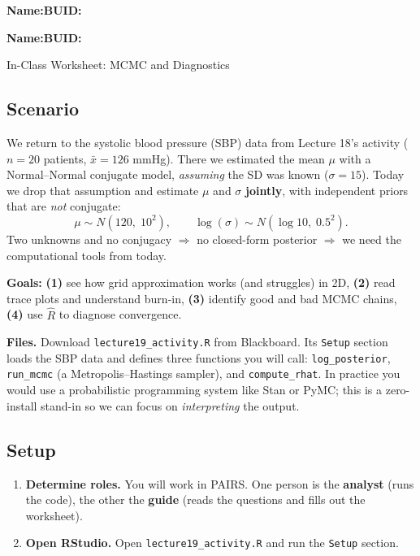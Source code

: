 \documentclass{article}
\newcommand{\blankline}[1]{\underline{\hspace{#1}}}
\begin{document}
\noindent\textbf{Name:}\blankline{2.25in}\hfill\textbf{BUID:}\blankline{1.55in}

\medskip

\noindent\textbf{Name:}\blankline{2.25in}\hfill\textbf{BUID:}\blankline{1.55in}\newline

\begin{center}
 \Large In-Class Worksheet: MCMC and Diagnostics
\end{center}

\subsection*{Scenario}
We return to the systolic blood pressure (SBP) data from Lecture 18's activity ($n = 20$ patients, $\bar{x} = 126$ mmHg). There we estimated the mean $\mu$ with a Normal--Normal conjugate model, \emph{assuming} the SD was known ($\sigma = 15$). Today we drop that assumption and estimate $\mu$ and $\sigma$ \textbf{jointly}, with independent priors that are \emph{not} conjugate:
\[
\mu \sim N(120,\; 10^2), \qquad \log(\sigma) \sim N(\log 10,\; 0.5^2).
\]
Two unknowns and no conjugacy $\Rightarrow$ no closed-form posterior $\Rightarrow$ we need the computational tools from today.

\medskip
\noindent\textbf{Goals:}
\textbf{(1)} see how grid approximation works (and struggles) in 2D,
\textbf{(2)} read trace plots and understand burn-in,
\textbf{(3)} identify good and bad MCMC chains,
\textbf{(4)} use $\widehat{R}$ to diagnose convergence.

\medskip
\noindent\textbf{Files.} Download \texttt{lecture19\_activity.R} from Blackboard. Its \texttt{Setup} section loads the SBP data and defines three functions you will call: \texttt{log\_posterior}, \texttt{run\_mcmc} (a Metropolis--Hastings sampler), and \texttt{compute\_rhat}. In practice you would use a probabilistic programming system like Stan or PyMC; this is a zero-install stand-in so we can focus on \emph{interpreting} the output.

\subsection*{Setup}
\begin{enumerate}[label={\bfseries (\Alph*)},itemsep=.5em]
	\item \textbf{Determine roles.} You will work in PAIRS. One person is the \textbf{analyst} (runs the code), the other the \textbf{guide} (reads the questions and fills out the worksheet).
	\item \textbf{Open RStudio.} Open \texttt{lecture19\_activity.R} and run the \texttt{Setup} section.
\end{enumerate}
\end{document}
